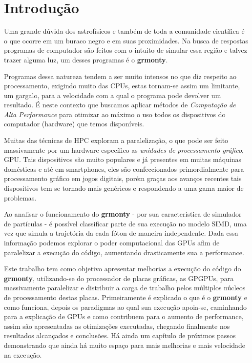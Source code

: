 \chapter{Introdução}
\label{cap:introducao}

Uma grande dúvida dos astrofísicos e também de toda a comunidade científica é o que ocorre em um buraco negro e em suas proximidades. Na busca de respostas programas de computador são feitos com o intuito de simular essa região e talvez trazer alguma luz, um desses programas é o \textbf{grmonty}\citep{Dolence:09}.

Programas dessa natureza tendem a ser muito intensos no que diz respeito ao processamento, exigindo muito das CPUs, estas tornam-se assim um limitante, um gargalo, para a velocidade com a qual o programa pode devolver um resultado. É neste contexto que buscamos aplicar métodos de \emph{Computação de Alta Performance} para otimizar ao máximo o uso todos os dispositivos do computador (hardware) que temos disponíveis.

Muitas das técnicas de HPC exploram a paralelização, o que pode ser feito massivamente por um hardware específico as \emph{unidades de processamento gráfico}, GPU. Tais dispositivos são muito populares e já presentes em muitas máquinas domésticas e até em smartphones, eles são confeccionados primordialmente para processamento gráfico em jogos digitais, porém graças aos avanços recentes tais dispositivos tem se tornado mais genéricos e respondendo a uma gama maior de problemas.

Ao analisar o funcionamento do \textbf{grmonty} - por sua característica de simulador de partículas - é possível classificar parte de sua execução no modelo SIMD, uma vez que simula a trajetória da cada fóton de maneira independente. Dada essa informação podemos explorar o poder computacional das GPUs afim de paralelizar a execução do código, aumentando drasticamente sua a performance.

Este trabalho tem como objetivo apresentar melhorias a execução do código do \textbf{grmonty}, utilizando-se do processador de placas gráficas, as GPGPUs, para massivamente paralelizar e distribuir a carga de trabalho pelos múltiplos núcleos de processamento destas placas. Primeiramente é explicado o que é o \textbf{grmonty} e como funciona, depois os paradigmas ao qual sua execução apoia-se, caminhando para a explicação de GPUs e como contribuem para o aumento de performance, assim são apresentadas as otimizações executadas, chegando finalmente nos resultados alcançados e conclusões. Há ainda um capítulo de próximos passos demonstrando que ainda há muito espaço para mais melhorias e mais velocidade na execução.

